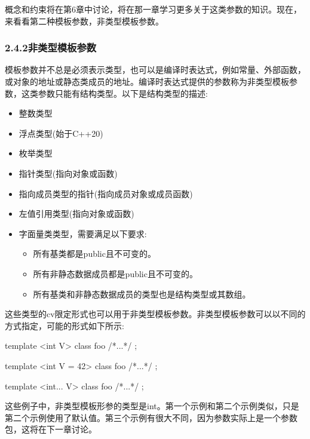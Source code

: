 概念和约束将在第6章中讨论，将在那一章学习更多关于这类参数的知识。现在，来看看第二种模板参数，非类型模板参数。


\subsubsection{2.4.2\hspace{0.2cm}非类型模板参数}

模板参数并不总是必须表示类型，也可以是编译时表达式，例如常量、外部函数，或对象的地址或静态类成员的地址。编译时表达式提供的参数称为非类型模板参数，这类参数只能有结构类型。以下是结构类型的描述:

\begin{itemize}
\item 
整数类型

\item 
浮点类型(始于C++20)

\item 
枚举类型

\item 
指针类型(指向对象或函数)

\item 
指向成员类型的指针(指向成员对象或成员函数)

\item 
左值引用类型(指向对象或函数)

\item 
字面量类类型，需要满足以下要求:
\begin{itemize}
\item 
所有基类都是public且不可变的。

\item 
所有非静态数据成员都是public且不可变的。

\item 
所有基类和非静态数据成员的类型也是结构类型或其数组。
\end{itemize}
\end{itemize}

这些类型的cv限定形式也可以用于非类型模板参数。非类型模板参数可以以不同的方式指定，可能的形式如下所示:

\begin{cpp}
template <int V>
class foo { /*...*/ };

template <int V = 42>
class foo { /*...*/ };

template <int... V>
class foo { /*...*/ };
\end{cpp}

这些例子中，非类型模板形参的类型是int。第一个示例和第二个示例类似，只是第二个示例使用了默认值。第三个示例有很大不同，因为参数实际上是一个参数包，这将在下一章讨论。

